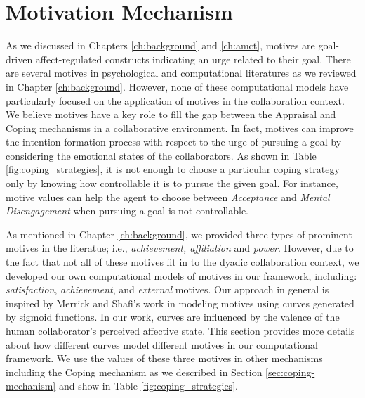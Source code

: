 \documentclass[12pt]{report}
\begin{document}
\section{Motivation Mechanism}
\label{sec:motivation_mechanism}
As we discussed in Chapters \ref{ch:background} and \ref{ch:amct}, motives are
goal-driven affect-regulated constructs indicating an urge related to their
goal. There are several motives in psychological and computational literatures
as we reviewed in Chapter \ref{ch:background}. However, none of these
computational models have particularly focused on the application of motives in
the collaboration context. We believe motives have a key role to
fill the gap between the Appraisal and Coping mechanisms in a collaborative
environment. In fact, motives can improve the intention formation process with
respect to the urge of pursuing a goal by considering the emotional states of
the collaborators. As shown in Table \ref{fig:coping_strategies}, it is not
enough to choose a particular coping strategy only by knowing how controllable
it is to pursue the given goal. For instance, motive values can help the agent
to choose between \textit{Acceptance} and \textit{Mental Disengagement} when
pursuing a goal is not controllable.

As mentioned in Chapter \ref{ch:background}, we provided three types
of prominent motives in the literatue; i.e., \textit{achievement, affiliation} and
\textit{power}. However, due to the fact that not all of these motives fit in to
the dyadic collaboration context, we developed our own computational models of
motives in our framework, including: \textit{satisfaction},
\textit{achievement}, and \textit{external} motives. Our approach in general is
inspired by Merrick and Shafi's work in
\cite{merrick:acheievement-affiliation-power} modeling motives using curves
generated by sigmoid functions. In our work, curves are influenced by the
valence of the human collaborator's perceived affective state. This section provides
more details about how different curves model different motives in our computational
framework. We use the values of these three motives in other mechanisms
including the Coping mechanism as we described in Section
\ref{sec:coping-mechanism} and show in Table \ref{fig:coping_strategies}.
\end{document}
